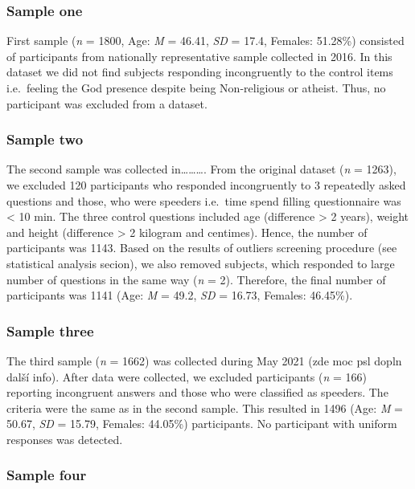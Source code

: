 \documentclass[ijerph,article,accept,moreauthors,pdftex]{mdpi}
\begin{document}
\hypertarget{sample-one}{%
\subsubsection{Sample one}\label{sample-one}}

First sample (\emph{n} = 1800, Age: \emph{M} = 46.41, \emph{SD} = 17.4,
Females: 51.28\%) consisted of participants from nationally
representative sample collected in 2016. In this dataset we did not find
subjects responding incongruently to the control items i.e.~feeling the
God presence despite being Non-religious or atheist. Thus, no
participant was excluded from a dataset.

\hypertarget{sample-two}{%
\subsubsection{Sample two}\label{sample-two}}

The second sample was collected in\ldots\ldots\ldots. From the original
dataset (\emph{n} = 1263), we excluded 120 participants who responded
incongruently to 3 repeatedly asked questions and those, who were
speeders i.e.~time spend filling questionnaire was \textless{} 10 min.
The three control questions included age (difference \textgreater{} 2
years), weight and height (difference \textgreater{} 2 kilogram and
centimes). Hence, the number of participants was 1143. Based on the
results of outliers screening procedure (see statistical analysis
secion), we also removed subjects, which responded to large number of
questions in the same way (\emph{n} = 2). Therefore, the final number of
participants was 1141 (Age: \emph{M} = 49.2, \emph{SD} = 16.73, Females:
46.45\%).

\hypertarget{sample-three}{%
\subsubsection{Sample three}\label{sample-three}}

The third sample (\emph{n} = 1662) was collected during May 2021 (zde
moc psl dopln další info). After data were collected, we excluded
participants (\emph{n} = 166) reporting incongruent answers and those
who were classified as speeders. The criteria were the same as in the
second sample. This resulted in 1496 (Age: \emph{M} = 50.67, \emph{SD} =
15.79, Females: 44.05\%) participants. No participant with uniform
responses was detected.

\hypertarget{sample-four}{%
\subsubsection{Sample four}\label{sample-four}}
\end{document}
